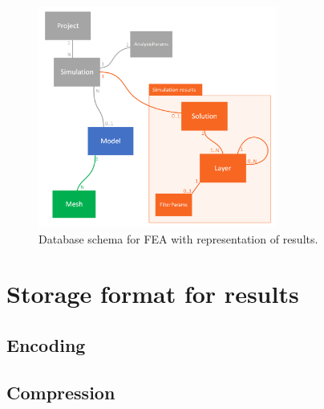 \begin{figure}[H]
    \centering
    \includegraphics[width=0.7\textwidth]{figures/FEA-database-schema-with-results}
    \decoRule
    \caption{Database schema for FEA with representation of results.}
    \label{fig:FEA-db-schema-results}
\end{figure}

\section{Storage format for results}
\label{sec:storage-format}




\subsection {Encoding}

\subsection {Compression}

